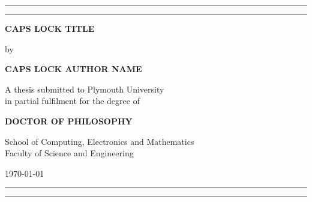 {\centering
\rule{\textwidth}{1pt}\par %
\vspace{2pt}\vspace{-\baselineskip} %
\rule{\textwidth}{0.4pt}\par %

\vspace*{4\baselineskip}
\centering
\textbf{CAPS LOCK TITLE}
\vspace*{2\baselineskip}

by
\vspace*{2\baselineskip}

\textbf{CAPS LOCK AUTHOR NAME}
\vspace*{6\baselineskip}

A thesis submitted to Plymouth University\\
in partial fulfilment for the degree of
\vspace*{2\baselineskip}

\textbf{DOCTOR OF PHILOSOPHY}
\vfill

School of Computing, Electronics and Mathematics\\
Faculty of Science and Engineering
\vspace*{2\baselineskip}

\today

\rule{\textwidth}{0.4pt}\par %
\vspace{2pt}\vspace{-\baselineskip} %
\rule{\textwidth}{1pt}\par} %